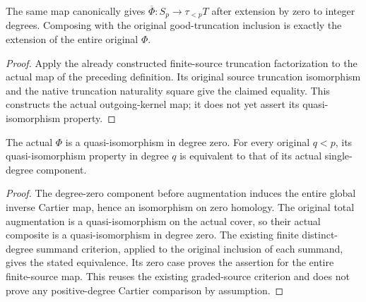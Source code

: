 \begin{definition}
\label{def:di-actual-witt-truncated-source-map}
\leanok
{}
The same map canonically gives
$\overline\Phi:S_p\to\tau_{<p}T$ after extension by zero to integer
degrees. Composing with the original good-truncation inclusion is exactly
the extension of the entire original $\Phi$.
\end{definition}
\begin{proof}
\leanok
Apply the already constructed finite-source truncation factorization to
the actual map of the preceding definition. Its original source
truncation isomorphism and the native truncation naturality square give
the claimed equality. This constructs the actual outgoing-kernel map;
it does not yet assert its quasi-isomorphism property.
\end{proof}

\begin{lemma}
\label{lem:di-actual-witt-zero-range}
\leanok
{}
The actual $\Phi$ is a quasi-isomorphism in degree zero. For every
original $q<p$, its quasi-isomorphism property in degree $q$ is
equivalent to that of its actual single-degree component.
\end{lemma}
\begin{proof}
\leanok
The degree-zero component before augmentation induces the entire global
inverse Cartier map, hence an isomorphism on zero homology. The original
total augmentation is a quasi-isomorphism on the actual cover, so their
actual composite is a quasi-isomorphism in degree zero. The existing
finite distinct-degree summand criterion, applied to the original
inclusion of each summand, gives the stated equivalence. Its zero case
proves the assertion for the entire finite-source map. This reuses the
existing graded-source criterion and does not prove any positive-degree
Cartier comparison by assumption.
\end{proof}

